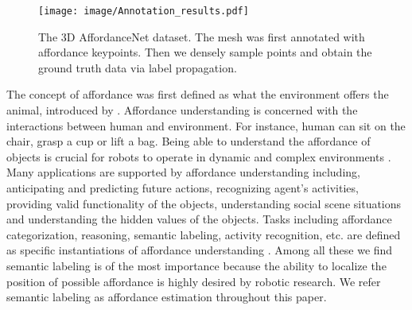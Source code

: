 \documentclass[final]{cvpr}
\begin{document}
\begin{figure}[t]
   \begin{center}
      \texttt{[image: image/Annotation\_results.pdf]}
   \end{center}
   \vspace{-0.4cm}
   \caption{The 3D AffordanceNet dataset. The mesh was first annotated with affordance keypoints. Then we densely sample points and obtain the ground truth data via label propagation.}
   \label{annotation image}
   \vspace{-0.6cm}
\end{figure}

The concept of affordance was first defined as what the environment  offers  the  animal,  introduced by \cite{gibson1979ecological}.
Affordance understanding is concerned with the interactions between human and environment. For instance, human can sit on the chair, grasp a cup or lift a bag. Being able to understand the affordance of objects is crucial for robots to operate in dynamic and complex environments \cite{hassanin2018visual}. Many applications are supported by affordance understanding including, anticipating and predicting future actions\cite{koppula2013learning,jain2016structural,koppula2015anticipating},
recognizing agent's activities\cite{qi2017predicting,earley1970efficient,vu2014predicting},
providing valid functionality of the objects\cite{grabner2011makes},
understanding social scene situations\cite{chuang2018learning}
and understanding the hidden values of the objects\cite{zhu2015understanding}. Tasks including affordance categorization, reasoning, semantic labeling, activity recognition, etc. are defined as specific instantiations of affordance understanding \cite{hassanin2018visual}. Among all these we find semantic labeling \cite{roy2016multi,zhu2015understanding} is of the most importance because the ability to localize the position of possible affordance is highly desired by robotic research. We refer semantic labeling as affordance estimation throughout this paper.
\end{document}
